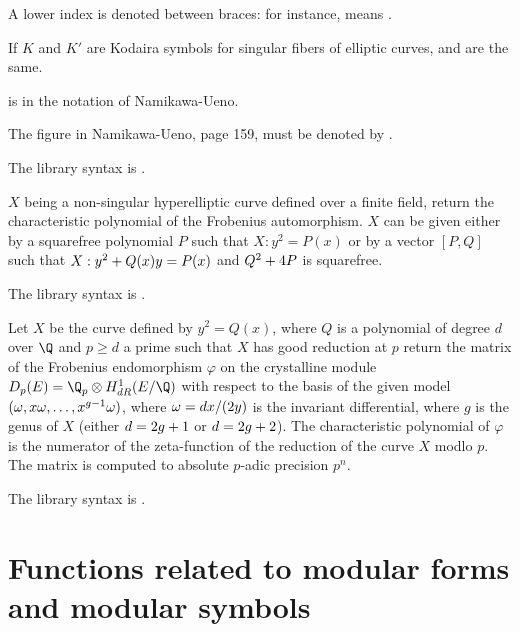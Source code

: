 \item A lower index is denoted between braces: for instance,  means \kbd{[I\_2-II-5]}.

\item If $K$ and $K'$ are Kodaira symbols for singular fibers of elliptic
curves, \kbd{[$K$-$K'$-m]} and \kbd{[$K'$-$K$-m]} are the same.

\item \kbd{[$K$-$K'$-$-1$]}  is \kbd{[$K'$-$K$-$\alpha$]} in the notation of
Namikawa-Ueno.

\item The figure \kbd{[2I\_0-m]} in Namikawa-Ueno, page 159, must be denoted
by \kbd{[2I\_0-(m+1)]}.

The library syntax is .

\label{se:hyperellcharpoly}
$X$ being a non-singular hyperelliptic curve defined over a finite field,
return the characteristic polynomial of the Frobenius automorphism.
$X$ can be given either by a squarefree polynomial $P$ such that
$X: y^2 = P(x)$ or by a vector $[P,Q]$ such that
$X: y^2 + Q(x)\*y = P(x)$ and $Q^2+4\*P$ is squarefree.

The library syntax is .

\label{se:hyperellpadicfrobenius}
Let $X$ be the curve defined by $y^2=Q(x)$, where  $Q$ is a polynomial of
degree $d$ over $\Q$ and $p\ge d$ a prime such that $X$ has good reduction
at $p$ return the matrix of the Frobenius endomorphism $\varphi$ on the
crystalline module $D_p(E) = \Q_p \otimes H^1_{dR}(E/\Q)$ with respect to the
basis of the given model $(\omega, x\*\omega,\ldots,x^{g-1}\*\omega)$, where
$\omega = dx/(2\*y)$ is the invariant differential, where $g$ is the genus of
$X$ (either $d=2\*g+1$ or $d=2\*g+2$).  The characteristic polynomial of
$\varphi$ is the numerator of the zeta-function of the reduction of the curve
$X$ modlo $p$. The matrix is computed to absolute $p$-adic precision $p^n$.

The library syntax is .

\section{Functions related to modular forms and modular symbols}


